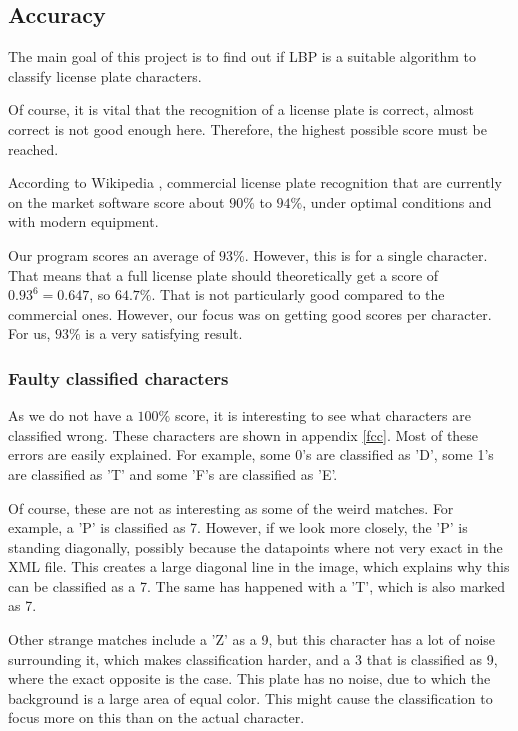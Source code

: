 \documentclass[a4paper]{article}
\begin{document}
\subsection{Accuracy}

The main goal of this project is to find out if LBP is a suitable algorithm to
classify license plate characters.

Of course, it is vital that the recognition of a license plate is correct,
almost correct is not good enough here. Therefore, the highest possible score
must be reached.

According to Wikipedia \cite{wikiplate}, commercial license plate recognition
that are currently on the market software score about $90\%$ to $94\%$, under
optimal conditions and with modern equipment.

Our program scores an average of $93\%$. However, this is for a single
character. That means that a full license plate should theoretically
get a score of $0.93^6 = 0.647$, so $64.7\%$. That is not particularly
good compared to the commercial ones. However, our focus was on getting
good scores per character. For us, $93\%$ is a very satisfying result.

\subsubsection*{Faulty classified characters}

As we do not have a $100\%$ score, it is interesting to see what characters are
classified wrong. These characters are shown in appendix \ref{fcc}. Most of
these errors are easily explained. For example, some 0's are classified as
'D', some 1's are classified as 'T' and some 'F's are classified as 'E'.

Of course, these are not as interesting as some of the weird matches. For
example, a 'P' is classified as 7. However, if we look more closely, the 'P' is
standing diagonally, possibly because the datapoints where not very exact in
the XML file. This creates a large diagonal line in the image, which explains
why this can be classified as a 7. The same has happened with a 'T', which is
also marked as 7.

Other strange matches include a 'Z' as a 9, but this character has a lot of
noise surrounding it, which makes classification harder, and a 3 that is
classified as 9, where the exact opposite is the case. This plate has no noise,
due to which the background is a large area of equal color. This might cause
the classification to focus more on this than on the actual character.
\end{document}

